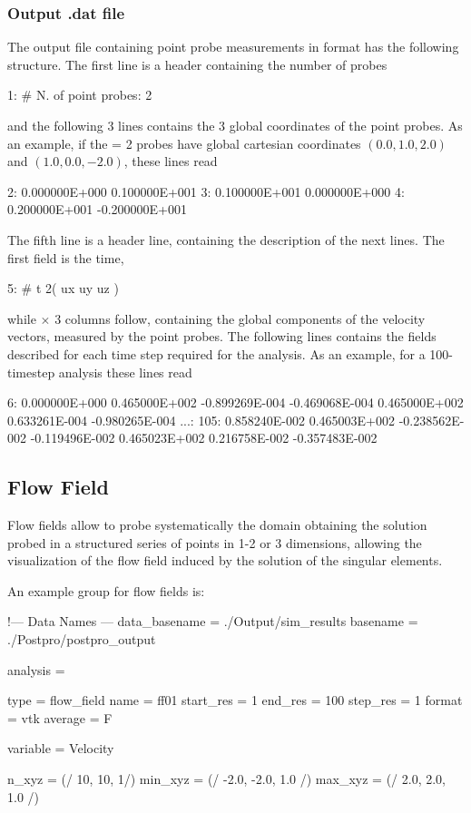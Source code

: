 \subsubsection{Output .dat file}

The output file containing point probe measurements in  format has 
the following structure. The first line is a header containing the number of probes
\begin{inputfile}[frame=single]
 1:  # N. of point probes:           2
\end{inputfile}
and the following 3 lines contains the 3 global coordinates of the point probes. 
As an example, if the  = 2 probes have global cartesian coordinates 
$(0.0,1.0,2.0)$ and $(1.0,0.0,-2.0)$, these lines read
\begin{inputfile}[frame=single]
 2:  0.000000E+000  0.100000E+001
 3:  0.100000E+001  0.000000E+000
 4:  0.200000E+001 -0.200000E+001
\end{inputfile}
The fifth line is a header line, containing the description of the next lines. 
The first field is the time,
\begin{inputfile}[frame=single]
 5:  #    t     2(   ux  uy  uz )
\end{inputfile}
while  $\times$ 3 columns follow, containing the global 
components of the velocity vectors, measured by the point probes. 
The following lines contains the fields described for each time step 
required for the analysis. As an example, for a 100-timestep analysis 
these lines read
\begin{inputfile}[frame=single]
  6: 0.000000E+000  0.465000E+002  -0.899269E-004  -0.469068E-004  0.465000E+002
     0.633261E-004 -0.980265E-004   
...:
105: 0.858240E-002  0.465003E+002  -0.238562E-002  -0.119496E-002  0.465023E+002
     0.216758E-002 -0.357483E-002
\end{inputfile}

\subsection{Flow Field}

Flow fields allow to probe systematically the domain obtaining the solution 
probed in a structured series of points in 1-2 or 3 dimensions, allowing the 
visualization of the flow field induced by the solution of the singular elements.

An example  group for flow fields is:

\begin{inputfile}[frame=single, caption={dust\_post.in for flow fields}, 
  label={file:dust_post.in_flow_fields}]
!--- Data Names ---
data_basename = ./Output/sim_results
basename =     ./Postpro/postpro_output

analysis = {

type = flow_field
name = ff01
start_res = 1
end_res   = 100 
step_res  = 1
format = vtk
average = F

variable = Velocity

n_xyz = (/ 10, 10, 1/)
min_xyz = (/ -2.0, -2.0, 1.0 /)
max_xyz = (/ 2.0, 2.0, 1.0 /)
}
\end{inputfile}

